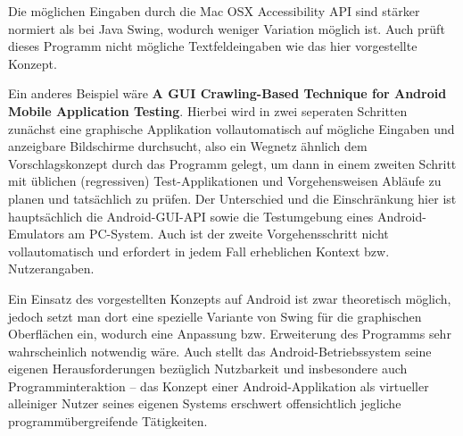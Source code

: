 Die möglichen Eingaben durch die \glqq{}Mac OSX Accessibility API\grqq{} sind stärker normiert als bei
Java Swing, wodurch weniger Variation möglich ist. Auch prüft dieses Programm nicht mögliche
Textfeldeingaben wie das hier vorgestellte Konzept.

\vspace{0.5cm}

Ein anderes Beispiel wäre \textbf{\glqq{}A GUI Crawling-Based Technique for Android Mobile Application
Testing\grqq{}}\cite{AGCBTFAMAT}. Hierbei wird in zwei seperaten Schritten zunächst eine graphische Applikation
vollautomatisch auf mögliche Eingaben und anzeigbare Bildschirme durchsucht, also ein
\glqq{}Wegnetz\grqq{} ähnlich dem Vorschlagskonzept durch das Programm gelegt, um dann in einem zweiten
Schritt mit üblichen (regressiven) Test-Applikationen und Vorgehensweisen Abläufe zu
planen und tatsächlich zu prüfen. Der Unterschied und die Einschränkung hier ist
hauptsächlich die Android-GUI-API sowie die Testumgebung eines Android-Emulators am
PC-System. Auch ist der zweite Vorgehensschritt nicht vollautomatisch und erfordert in jedem Fall
erheblichen Kontext bzw. Nutzerangaben.

Ein Einsatz des vorgestellten Konzepts auf Android ist zwar theoretisch möglich, jedoch setzt
man dort eine spezielle Variante von Swing für die graphischen Oberflächen ein, 
wodurch eine Anpassung bzw. Erweiterung des Programms sehr wahrscheinlich notwendig wäre. 
Auch stellt das Android-Betriebssystem seine eigenen Herausforderungen
bezüglich Nutzbarkeit und insbesondere auch Programminteraktion -- das Konzept
einer Android-Applikation als virtueller alleiniger Nutzer seines eigenen Systems
erschwert offensichtlich jegliche programmübergreifende Tätigkeiten.
